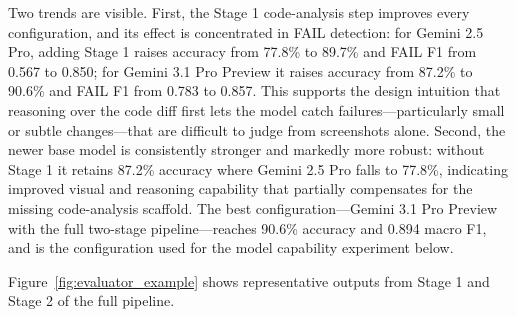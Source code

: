 \documentclass[sigconf,nonacm]{acmart}
\begin{document}
Two trends are visible. First, the Stage 1 code-analysis step improves every configuration, and its effect is concentrated in FAIL detection: for Gemini 2.5 Pro, adding Stage 1 raises accuracy from 77.8\% to 89.7\% and FAIL F1 from 0.567 to 0.850; for Gemini 3.1 Pro Preview it raises accuracy from 87.2\% to 90.6\% and FAIL F1 from 0.783 to 0.857. This supports the design intuition that reasoning over the code diff first lets the model catch failures—particularly small or subtle changes—that are difficult to judge from screenshots alone. Second, the newer base model is consistently stronger and markedly more robust: without Stage 1 it retains 87.2\% accuracy where Gemini 2.5 Pro falls to 77.8\%, indicating improved visual and reasoning capability that partially compensates for the missing code-analysis scaffold. The best configuration—Gemini 3.1 Pro Preview with the full two-stage pipeline—reaches 90.6\% accuracy and 0.894 macro F1, and is the configuration used for the model capability experiment below.

Figure~\ref{fig:evaluator_example} shows representative outputs from Stage 1 and Stage 2 of the full pipeline.
\end{document}
